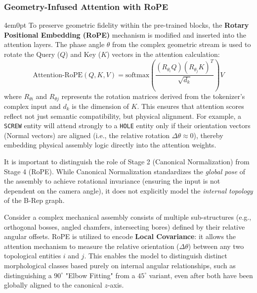 		\subsubsection{Geometry-Infused Attention with RoPE}
			\begin{indentedblock}{4em}{0pt}
				To preserve geometric fidelity within the pre-trained blocks, the \textbf{Rotary Positional Embedding (RoPE)} mechanism \parencite{su_2023_roformer} is modified and inserted into the attention layers. The phase angle $\theta$ from the complex geometric stream is used to rotate the Query ($Q$) and Key ($K$) vectors in the attention calculation:
				\begin{equation}
					\text{Attention-RoPE}(Q, K, V) = \text{softmax}\left(\frac{(R_{\theta_i}Q)(R_{\theta_j}K)^T}{\sqrt{d_k}}\right)V
				\end{equation}
				where $R_{\theta i}$ and $R_{\theta j}$ represents the rotation matrices derived from the tokenizer's complex input and $d_k$ is the dimension of $K$. This ensures that attention scores reflect not just semantic compatibility, but physical alignment. For example, a \texttt{SCREW} entity will attend strongly to a \texttt{HOLE} entity only if their orientation vectors (Normal vectors) are aligned (i.e., the relative rotation $\Delta\theta \approx 0$), thereby embedding physical assembly logic directly into the attention weights.
				
				
				It is important to distinguish the role of Stage 2 (Canonical Normalization) from Stage 4 (RoPE). While Canonical Normalization standardizes the \textit{global pose} of the assembly to achieve rotational invariance (ensuring the input is not dependent on the camera angle), it does not explicitly model the \textit{internal topology} of the B-Rep graph.
				
				
				Consider a complex mechanical assembly consists of multiple sub-structures (e.g., orthogonal bosses, angled chamfers, intersecting bores) defined by their relative angular offsets. RoPE is utilized  to encode \textbf{Local Covariance}: it allows the attention mechanism to measure the relative orientation ($\Delta \theta$) between any two topological entities $i$ and $j$. This enables the model to distinguish distinct morphological classes based purely on internal angular relationships, such as distinguishing a $90^\circ$ "Elbow Fitting" from a $45^\circ$ variant, even after both have been globally aligned to the canonical $z$-axis.
			\end{indentedblock}
